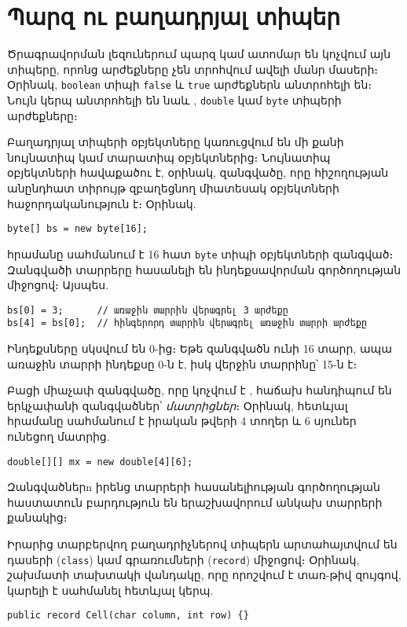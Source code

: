 %
%
%
\chapter{Պարզ ու բաղադրյալ տիպեր}

Ծրագրավորման լեզուներում պարզ կամ ատոմար են կոչվում այն տիպերը, որոնց
արժեքները չեն տրոհվում ավելի մանր մասերի։ Օրինակ, \texttt{boolean} տիպի
\texttt{false} և \texttt{true} արժեքներն անտրոհելի են։ Նույն կերպ անտրոհելի
են նաև , \texttt{double} կամ \texttt{byte} տիպերի արժեքները։

Բաղադրյալ տիպերի օբյեկտները կառուցվում են մի քանի նույնատիպ կամ տարատիպ
օբյեկտներից։ Նույնատիպ օբյեկտների հավաքածու է, օրինակ, զանգվածը, որը
հիշողության անընդհատ տիրույթ զբաղեցնող միատեսակ օբյեկտների հաջորդականություն
է։ Օրինակ.

\begin{verbatim}
byte[] bs = new byte[16];
\end{verbatim}

\noindent հրամանը սահմանում է 16 հատ \texttt{byte} տիպի օբյեկտների
զանգված։ Զանգվածի տարրերը հասանելի են ինդեքսավորման գործողության միջոցով։
Այսպես.

\begin{verbatim}
bs[0] = 3;      // առաջին տարրին վերագրել 3 արժեքը
bs[4] = bs[0];  // հինգերորդ տարրին վերագրել առաջին տարրի արժեքը
\end{verbatim}

Ինդեքսները սկսվում են 0-ից։ Եթե զանգվածն ունի 16 տարր, ապա առաջին տարրի
ինդեքսը 0-ն է, իսկ վերջին տարրինը՝ 15-ն է։

Բացի միաչափ զանգվածը, որը կոչվում է , հաճախ հանդիպում են
երկչափանի զանգվածներ՝ \emph{մատրիցներ}։ Օրինակ, հետևյալ հրամանը սահմանում
է իրական թվերի 4 տողեր և 6 սյուներ ունեցող մատրից.

\begin{verbatim}
double[][] mx = new double[4][6];
\end{verbatim}

Զանգվածներn իրենց տարրերի հասանելիության գործողության հաստատուն բարդություն
են երաշխավորում անկախ տարրերի քանակից։

Իրարից տարբերվող բաղադրիչներով տիպերն արտահայտվում են դասերի (\texttt{class})
կամ գրառումների (\texttt{record}) միջոցով։ Օրինակ, շախմատի տախտակի վանդակը,
որը որոշվում է տառ-թիվ զույգով, կարելի է սահմանել հետևյալ կերպ.

\begin{verbatim}
public record Cell(char column, int row) {}
\end{verbatim}
